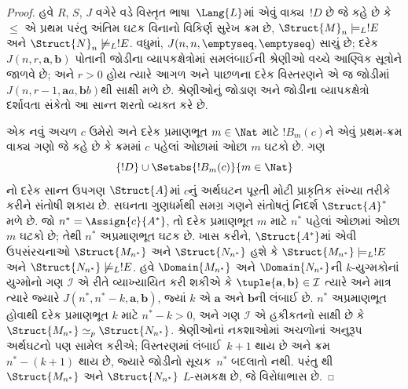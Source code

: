 \begin{proof}
હવે $R$, $S$, $J$ વગેરે વડે વિસ્તૃત ભાષા~$\Lang{L}$માં એવું
વાક્ય~$!D$ છે જે કહે છે કે $\le$ એ પ્રથમ પરંતુ અંતિમ ઘટક વિનાનો
વિકિર્ણ સુરેખ ક્રમ છે, $\Struct{M}_n \models_L !E$ અને
$\Struct{N}_n \not\models_L !E$. વધુમાં, $J(n,n,\emptyseq,\emptyseq)$
સાચું છે; દરેક $J(n,r,\mathbf{a},\mathbf{b})$ પોતાની જોડીના
વ્યાપકક્ષેત્રોમાં સમલંબાઈની શ્રેણીઓ વચ્ચે આણ્વિક સૂત્રોને જાળવે છે;
અને $r>0$ હોય ત્યારે આગળ અને પાછળના દરેક વિસ્તરણને એ જ જોડીમાં
$J(n,r-1,\mathbf{a}a,\mathbf{b}b)$થી સાક્ષી મળે છે.
શ્રેણીઓનું જોડાણ અને જોડીના વ્યાપકક્ષેત્રો દર્શાવતા સંકેતો આ સાન્ત
શરતો વ્યક્ત કરે છે.

એક નવું અચળ $c$ ઉમેરો અને દરેક પ્રમાણભૂત $m\in\Nat$ માટે
$!B_m(c)$ને એવું પ્રથમ-ક્રમ વાક્ય ગણો જે કહે છે કે ક્રમમાં
$c$ પહેલાં ઓછામાં ઓછા $m$ ઘટકો છે. ગણ
\[
  \{!D\} \cup \Setabs{!B_m(c)}{m\in\Nat}
\]
નો દરેક સાન્ત ઉપગણ $\Struct{A}$માં $c$નું અર્થઘટન પૂરતી મોટી પ્રાકૃતિક
સંખ્યા તરીકે કરીને સંતોષી શકાય છે. સઘનતા ગુણધર્મથી સમગ્ર ગણને સંતોષતું
નિદર્શ $\Struct{A}^*$ મળે છે. જો $n^*=\Assign{c}{A^*}$, તો દરેક
પ્રમાણભૂત $m$ માટે $n^*$ પહેલાં ઓછામાં ઓછા $m$ ઘટકો છે; તેથી $n^*$
અપ્રમાણભૂત ઘટક છે.
ખાસ કરીને, $\Struct{A^*}$માં એવી ઉપસંરચનાઓ
$\Struct{M_{n^*}}$ અને $\Struct{N_{n^*}}$ હશે કે
$\Struct{M_{n^*}} \models_L !E$ અને $\Struct{N_{n^*}}
\not\models_L !E$. હવે $\Domain{M_{n^*}}$ અને
$\Domain{N_{n^*}}$ની $k$-યુગ્મકોનાં યુગ્મોનો ગણ $\mathcal{I}$ એ રીતે
વ્યાખ્યાયિત કરી શકીએ કે
$\tuple{\mathbf{a}, \mathbf{b}} \in \mathcal{I}$ ત્યારે અને માત્ર
ત્યારે જ્યારે $J(n^*,n^*-k,\mathbf{a},\mathbf{b})$, જ્યાં $k$ એ
$\mathbf{a}$ અને $\mathbf{b}$ની લંબાઈ છે. $n^*$ અપ્રમાણભૂત હોવાથી
દરેક પ્રમાણભૂત $k$ માટે $n^* - k >0$, અને ગણ $\mathcal{I}$ એ હકીકતનો
સાક્ષી છે કે $\Struct{M_{n^*}} \simeq_p \Struct{N_{n^*}}$.
શ્રેણીઓનાં નકશાઓમાં અચળોનાં અનુરૂપ અર્થઘટનો પણ સામેલ કરીએ;
વિસ્તરણમાં લંબાઈ~$k+1$ થાય છે અને ક્રમ~$n^*-(k+1)$ થાય છે, જ્યારે
જોડીનો સૂચક~$n^*$ બદલાતો નથી. પરંતુ
થી $\Struct{M_{n^*}}$ અને
$\Struct{N_{n^*}}$ $L$-સમકક્ષ છે, જે વિરોધાભાસ છે.
\end{proof}
\endgroup


\OLEndChapterHook
\endgroup


\OLEndPartHook
